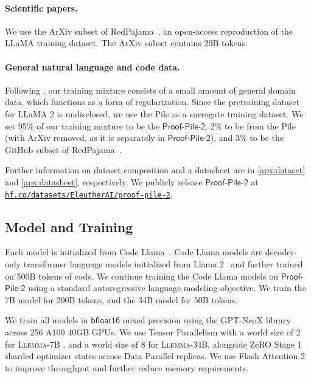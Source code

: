 \paragraph{Scientific papers.} We use the ArXiv subset of RedPajama~\citep{together2023redpajama}, an open-access reproduction of the LLaMA training dataset. The ArXiv subset contains 29B tokens.

\paragraph{General natural language and code data.} Following \cite{lewkowycz2022solving}, our training mixture consists of a small amount of general domain data, which functions as a form of regularization. Since the pretraining dataset for LLaMA 2 is undisclosed, we use the Pile \citep{gao2020pile,biderman2022datasheet} as a surrogate training dataset. We set 95\% of our training mixture to be the $\mathsf{Proof}$-$\mathsf{Pile}$-$\mathsf{2}$, 2\% to be from the  Pile (with ArXiv removed, as it is separately in $\mathsf{Proof}$-$\mathsf{Pile}$-$\mathsf{2}$), and 3\% to be the GitHub subset of RedPajama~\citep{together2023redpajama}.

Further information on dataset composition and a datasheet are in \autoref{apx:dataset} and \autoref{apx:datasheet}, respectively. We publicly release $\mathsf{Proof}$-$\mathsf{Pile}$-$\mathsf{2}$ at {\small\href{https://huggingface.co/datasets/EleutherAI/proof-pile-2}{\texttt{hf.co/datasets/EleutherAI/proof-pile-2}}}.

\subsection{Model and Training}\label{sec:training}
Each model is initialized from Code Llama~\citep{roziere2023code}. Code Llama models are decoder-only transformer language models initialized from Llama 2~\citep{touvron2023llama} and further trained on 500B tokens of code. We continue training the Code Llama models on $\mathsf{Proof}$-$\mathsf{Pile}$-$\mathsf{2}$ using a standard autoregressive language modeling objective. We train the 7B model for 200B tokens, and the 34B model for 50B tokens.  

We train all models in $\mathsf{bfloat16}$ mixed precision using the GPT-NeoX library \citep{gpt-neox-library} across 256 A100 40GB GPUs. We use Tensor Parallelism \citep{megatron-lm} with a world size of 2 for \textsc{Llemma}-7B , and a world size of 8 for \textsc{Llemma}-34B, alongside ZeRO Stage 1 sharded optimizer states \citep{rajbhandari2020zero} across Data Parallel \citep{goyal2017dataparallel} replicas. We use Flash Attention 2 \citep{dao2023flashattention2} to improve throughput and further reduce memory requirements.

